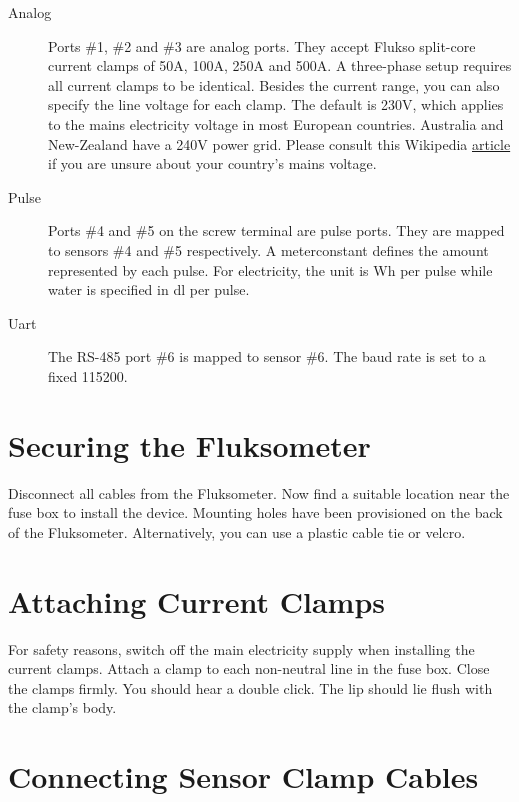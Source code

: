 \begin{description}

\item[Analog] Ports \#1, \#2 and \#3 are analog ports. They accept Flukso split-core current clamps of 50A, 100A, 250A and 500A. A three-phase setup requires all current clamps to be identical. Besides the current range, you can also specify the line voltage for each clamp. The default is 230V, which applies to the mains electricity voltage in most European countries. Australia and New-Zealand have a 240V power grid. Please consult this Wikipedia \href{http://en.wikipedia.org/wiki/Mains_electricity_by_country}{article} if you are unsure about your country's mains voltage.

\item[Pulse] Ports \#4 and \#5 on the screw terminal are pulse ports. They are mapped to sensors \#4 and \#5 respectively. A meterconstant defines the amount represented by each pulse. For electricity, the unit is Wh per pulse while water is specified in dl per pulse.

\item[Uart] The RS-485 port \#6 is mapped to sensor \#6. The baud rate is set to a fixed 115200.

\end{description}

\section{Securing the Fluksometer}

Disconnect all cables from the Fluksometer. Now find a suitable location near the fuse box to install the device. Mounting holes have been provisioned on the back of the Fluksometer. Alternatively, you can use a plastic cable tie or velcro.

\section{Attaching Current Clamps}

For safety reasons, switch off the main electricity supply when installing the current clamps. Attach a clamp to each non-neutral line in the fuse box. Close the clamps firmly. You should hear a double click. The lip should lie flush with the clamp's body.

\section{Connecting Sensor Clamp Cables}

